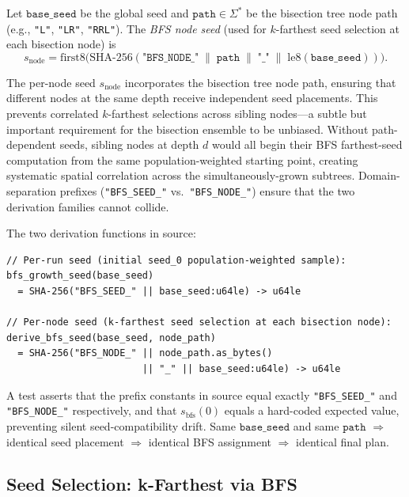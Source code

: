 \begin{definition}
\label{def:bfs-node-seed}
Let $\mathtt{base\_seed}$ be the global seed and $\mathtt{path} \in
\Sigma^*$ be the bisection tree node path (e.g., \texttt{"L"}, \texttt{"LR"},
\texttt{"RRL"}).
The \emph{BFS node seed} (used for $k$-farthest seed selection at each
bisection node) is
\[
  s_{\mathrm{node}}
  = \mathrm{first8}\bigl(
    \mathrm{SHA\text{-}256}(
      \texttt{"BFS\_NODE\_"} \;\|\; \mathtt{path} \;\|\;
      \texttt{"\_"} \;\|\; \mathrm{le8}(\mathtt{base\_seed})
    )
  \bigr).
\]
\end{definition}

\begin{remark}
The per-node seed $s_{\mathrm{node}}$ incorporates the bisection tree node
path, ensuring that different nodes at the same depth receive independent
seed placements.
This prevents correlated $k$-farthest selections across sibling nodes---a
subtle but important requirement for the bisection ensemble to be unbiased.
Without path-dependent seeds, sibling nodes at depth $d$ would all begin
their BFS farthest-seed computation from the same population-weighted
starting point, creating systematic spatial correlation across the
simultaneously-grown subtrees.
Domain-separation prefixes (\texttt{"BFS\_SEED\_"} vs.\ \texttt{"BFS\_NODE\_"})
ensure that the two derivation families cannot collide.
\end{remark}

The two derivation functions in source:
\begin{verbatim}
// Per-run seed (initial seed_0 population-weighted sample):
bfs_growth_seed(base_seed)
  = SHA-256("BFS_SEED_" || base_seed:u64le) -> u64le

// Per-node seed (k-farthest seed selection at each bisection node):
derive_bfs_seed(base_seed, node_path)
  = SHA-256("BFS_NODE_" || node_path.as_bytes()
                        || "_" || base_seed:u64le) -> u64le
\end{verbatim}
A test asserts that the prefix constants in source equal exactly
\texttt{"BFS\_SEED\_"} and \texttt{"BFS\_NODE\_"} respectively, and
that $s_{\mathrm{bfs}}(0)$ equals a hard-coded expected value, preventing
silent seed-compatibility drift.
Same $\mathtt{base\_seed}$ and same $\mathtt{path}$
$\Rightarrow$ identical seed placement
$\Rightarrow$ identical BFS assignment
$\Rightarrow$ identical final plan.

\subsection{Seed Selection: k-Farthest via BFS}

